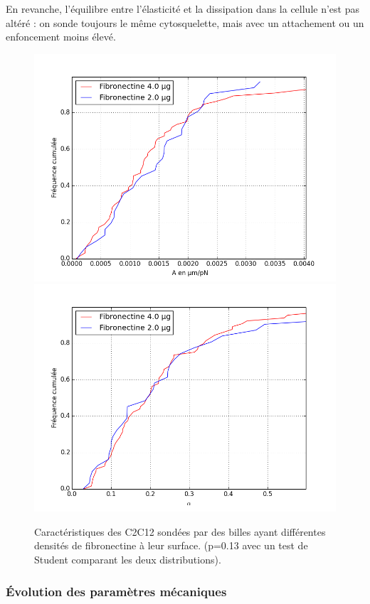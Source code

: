 En revanche, l'équilibre entre l'élasticité et la dissipation dans la cellule n'est pas altéré : on sonde toujours le même cytosquelette, mais avec un attachement ou un enfoncement moins élevé. 

\begin{figure}
\includegraphics[scale=0.5]{Figures/A_coating_seul.png} 
\includegraphics[scale=0.5]{Figures/E_coating_seul.png} 
\caption{Caractéristiques des C2C12 sondées par des billes ayant différentes densités de fibronectine à leur surface. (p=0.13 avec un test de Student comparant les deux distributions). }
\end{figure}

\subsubsection{\'Evolution des paramètres mécaniques}

